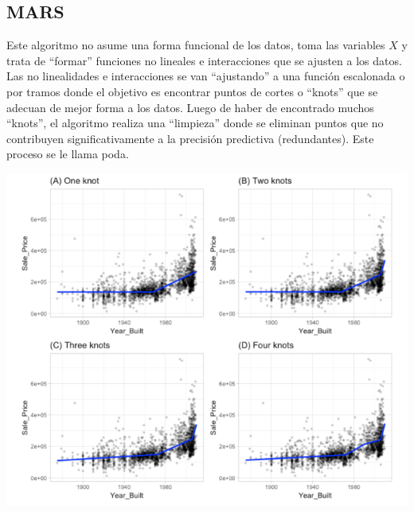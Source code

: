 \documentclass[
]{article}
\begin{document}
\hypertarget{mars}{%
\subsection{MARS}\label{mars}}

Este algoritmo no asume una forma funcional de los datos, toma las
variables \(X\) y trata de ``formar'' funciones no lineales e
interacciones que se ajusten a los datos. Las no linealidades e
interacciones se van ``ajustando'' a una función escalonada o por tramos
donde el objetivo es encontrar puntos de cortes o ``knots'' que se
adecuan de mejor forma a los datos. Luego de haber de encontrado muchos
``knots'', el algoritmo realiza una ``limpieza'' donde se eliminan
puntos que no contribuyen significativamente a la precisión predictiva
(redundantes). Este proceso se le llama poda.

\includegraphics{3.png}
\end{document}
